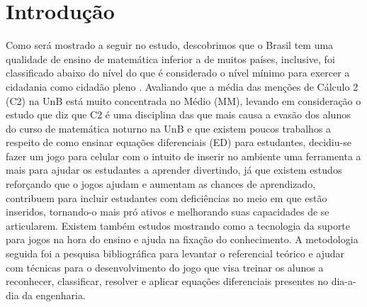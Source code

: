 \chapter[Introdução]{Introdução}

\begin{comment}
Tendo em vista que já é difícil para alunos aprenderem matemática, a dificuldade só aumenta quando fala-se de alunos com Transtorno do Déficit de Atenção com Hiperatividade (TDAH) inseridos no contexto de faculdade, onde a desatenção aumenta, já que professores não estão preparados e precisam renovar seus métodos para atrair atenção dos alunos para ensinar a matéria e ainda fazer disso algo divertido para fazer com que o foco seja maior ainda. Já que aprender brincando gera melhores resultados. Segundo (Russel A. Barkley, PhD. p. iv) quem possui TDAH têm mais dificuldades que pessoas normais em ambientes que exijam mais foco, objetividade e autocontrole. Também é dito que as características principais de TDAH podem trazer diversas dificuldades no contexto escolar (George J. DuPaul, PhD e Gary Stoner, PhD. p.4).

De acordo com (George J. DuPaul, PhD e Gary Stoner, PhD. p.4) o TDAH comparado a outros problemas como autismo e depressão é um transtorno de alta incidência e se mostra presente principalmente em meninos. Por isso o foco deste estudo também será em estudantes com TDAH.
\end{comment}

Como será mostrado a seguir no estudo, descobrimos que o Brasil tem uma qualidade de ensino de matemática inferior a de muitos países, inclusive, foi classificado abaixo do nível do que é considerado o nível mínimo para exercer a cidadania como cidadão pleno \cite{inep2015nivelcidadania}. Avaliando que a média das menções de Cálculo 2 (C2) na UnB está muito concentrada no Médio (MM), levando em consideração o estudo \cite{evasaoC2} que diz que C2 é uma disciplina das que mais causa a evasão dos alunos do curso de matemática noturno na UnB e que existem poucos trabalhos a respeito de como ensinar equações diferenciais (ED) para estudantes, decidiu-se fazer um jogo para celular com o intuito de inserir no ambiente uma ferramenta a mais para ajudar os estudantes a aprender divertindo, já que existem estudos reforçando que o jogos ajudam e aumentam as chances de aprendizado, contribuem para incluir estudantes com deficiências no meio em que estão inseridos, tornando-o mais pró ativos e melhorando suas capacidades de se articularem. Existem também estudos mostrando como a tecnologia da suporte para jogos na hora do ensino e ajuda na fixação do conhecimento. A metodologia seguida foi a pesquisa bibliográfica para levantar o referencial teórico e ajudar com técnicas para o desenvolvimento do jogo que visa treinar os alunos a reconhecer, classificar, resolver e aplicar equações diferenciais presentes no dia-a-dia da engenharia.


